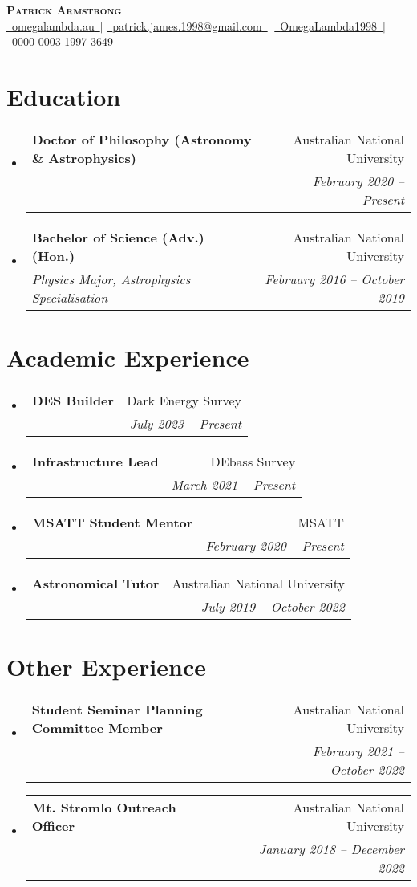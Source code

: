 \documentclass[letterpaper,11pt]{article}
\makeatletter
\newcommand{\resumeItem}[1]{
  \item\small{
    {#1 \vspace{-2pt}}
  }
}
\newcommand{\resumeSubheading}[4]{
  \vspace{-2pt}\item
    \begin{tabular*}{0.97\textwidth}[t]{l@{\extracolsep{\fill}}r}
      \textbf{#1} & #2 \\
      \textit{\small#3} & \textit{\small #4} \\
    \end{tabular*}\vspace{-7pt}
}
\newcommand{\resumeSubHeadingListStart}{\begin{itemize}[leftmargin=0.15in, label={}]}
\newcommand{\resumeSubHeadingListEnd}{\end{itemize}}
\newcommand{\resumeItemListStart}{\begin{itemize}}
\newcommand{\resumeItemListEnd}{\end{itemize}\vspace{-5pt}}
\newcommand{\insertName}{Patrick Armstrong}
\newcommand{\insertWebsite}{\href{https://www.omegalambda.au/}{\faIcon{globe}~\underline{omegalambda.au}~}}
\newcommand{\insertEmail}{\href{mailto:patrick.james.1998@gmail.com}{\faIcon{envelope}~\underline{patrick.james.1998@gmail.com}~}}
\newcommand{\insertGithub}{\href{https://www.github.com/OmegaLambda1998}{\faIcon{github}~\underline{OmegaLambda1998}~}}
\newcommand{\insertOrcid}{\href{https://www.orcid.org/000-003-1997-3649}{\faIcon{orcid}~\underline{0000-0003-1997-3649}}}
\newcommand{\educationElement}[4]{%
    \resumeSubHeadingListStart
        \resumeSubheading
            {#1}
            {#2}
            {#3}
            {#4}
    \resumeSubHeadingListEnd
}
\newcommand{\experienceElement}[5]{%
    \resumeSubHeadingListStart
        \resumeSubheading
            {#1}
            {#2}
            {\makecell[l]{#3}}
            {#4}
            {#5}
    \resumeSubHeadingListEnd
}
\makeatother
\begin{document}
\begin{center}
    \textbf{\Huge \scshape \insertName} \\ \vspace{2pt}
    \insertWebsite $|$ \insertEmail $|$ 
    \insertGithub $|$
    \insertOrcid
\end{center}


\section{Education}
  \educationElement{Doctor of Philosophy (Astronomy \& Astrophysics)}{Australian National University}{}{February 2020 -- Present}
  \educationElement{Bachelor of Science (Adv.) (Hon.)}{Australian National University}{Physics Major, Astrophysics Specialisation}{February 2016 -- October 2019}


\section{Academic Experience}

    \experienceElement{DES Builder}{Dark Energy Survey}{Develop \& maintain the~\href{https://github.com/dessn/Pippin}{\underline{Pippin}} pipeline, Internal review of DES papers, Organise \& host meetings.}{July 2023 -- Present}{}

    \experienceElement{Infrastructure Lead}{DEbass Survey}{Develop \& maintain the~\href{https://www.mso.anu.edu.au/debass/}{\underline{DEBass Survey}} database and website.}{March 2021 -- Present}{}

    \experienceElement{MSATT Student Mentor}{MSATT}{Provide guidance and mentorship for high-school students completing astronomical projects.}{February 2020 -- Present}{}

    \experienceElement{Astronomical Tutor}{Australian National University}{Sole tutor for~\textit{Galaxies and Cosmology (ASTR3002)}.}{July 2019 -- October 2022}{}

\section{Other Experience}

    \experienceElement{Student Seminar Planning Committee Member}{Australian National University}{[2022]: Senior planning committee member, [2021]: Planning committee member}{February 2021 -- October 2022}{}

    \experienceElement{Mt. Stromlo Outreach Officer}{Australian National University}{Deliver high quality outreach experience for school groups and families}{January 2018 -- December 2022}{}
\end{document}
